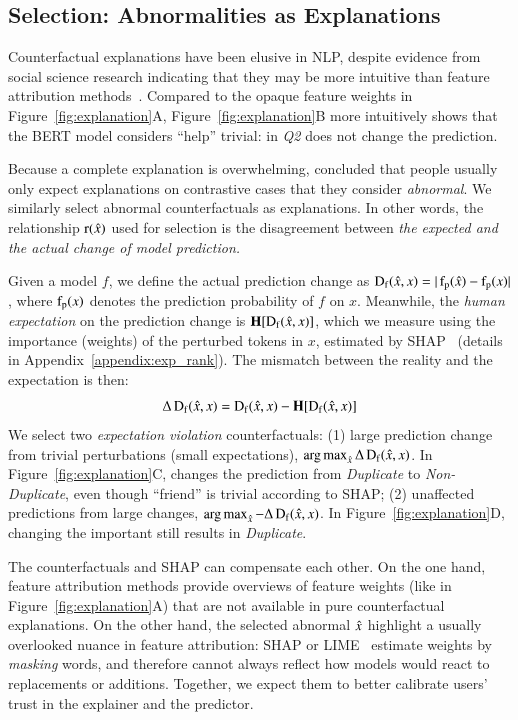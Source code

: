 \subsection{Selection: Abnormalities as Explanations}
\label{subsec:local_explain}


Counterfactual explanations have been elusive in NLP, despite evidence from social science research indicating that they may be more intuitive than feature attribution methods~\cite{miller}.
Compared to the opaque feature weights in Figure~\ref{fig:explanation}A, Figure~\ref{fig:explanation}B more intuitively shows that the BERT \qqp model considers ``help'' trivial: 
 in \emph{Q2} does not change the prediction.


Because a complete explanation is overwhelming, \citet{miller} concluded that people usually only expect explanations on contrastive cases that they consider \emph{abnormal}.
We similarly select abnormal counterfactuals as explanations.
In other words, the relationship $\operatorname*{r}(\hat{x})$ used for selection is the disagreement between \emph{the expected and the actual change of model prediction.}

Given a model $f$, we define the actual prediction change as $\operatorname*{D_f}(\hat{x}, x)=|\operatorname*{f_p}(\hat{x})-\operatorname*{f_p}(x)|$, where $\operatorname*{f_p}(x)$ denotes the prediction probability of $f$ on $x$.
Meanwhile, the \emph{human expectation} on the prediction change is $\operatorname*{\mathbf{H}}[\operatorname*{D_f}(\hat{x}, x)]$, which we measure using the importance (weights) of the perturbed tokens in $x$, estimated by SHAP~\cite{NIPS2017_7062} (details in Appendix~\ref{appendix:exp_rank}).
The mismatch between the reality and the expectation is then:
$$\Delta\operatorname*{D_f}(\hat{x}, x) = \operatorname*{D_f}(\hat{x}, x)-\operatorname*{\mathbf{H}}[\operatorname*{D_f}(\hat{x}, x)]$$
We select two \emph{expectation violation} counterfactuals:
(1) large prediction change from trivial perturbations (small expectations), \ie $\operatorname*{arg\,max}_{\hat{x}} \Delta\operatorname*{D_f}(\hat{x}, x)$.
In Figure~\ref{fig:explanation}C,  changes the prediction from \emph{Duplicate} to \emph{Non-Duplicate}, even though ``friend'' is trivial according to SHAP; 
(2) unaffected predictions from large changes, \ie $\operatorname*{arg\,max}_{\hat{x}} -\Delta\operatorname*{D_f}(\hat{x}, x)$. 
In Figure~\ref{fig:explanation}D, changing the important  still results in \emph{Duplicate}.

The counterfactuals and SHAP can compensate each other. 
On the one hand, feature attribution methods provide overviews of feature weights (like in Figure~\ref{fig:explanation}A) that are not available in pure counterfactual explanations.
On the other hand, the selected abnormal $\hat{x}$ highlight a usually overlooked nuance in feature attribution: SHAP or LIME~\cite{Ribeiro2016WhySI} estimate weights by \emph{masking} words, and therefore cannot always reflect how models would react to replacements or additions.
Together, we expect them to better calibrate users' trust in the explainer and the predictor.


